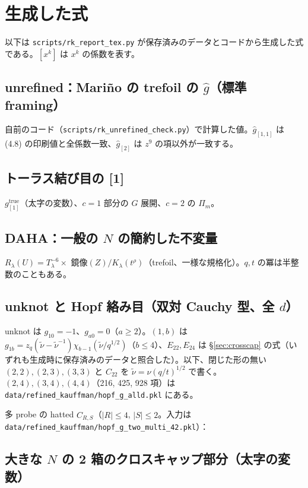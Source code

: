 \documentclass[a4paper,10pt]{ltjsarticle}
\newcommand{\tnu}{\tilde\nu}
\begin{document}
\appendix
\section{生成した式}\label{app:gen}
以下は \texttt{scripts/rk\_report\_tex.py} が保存済みのデータとコードから生成した式である。$[x^k]$ は $x^k$ の係数を表す。

\subsection{unrefined：Mariño の trefoil の $\hat g$（標準 framing）}\label{app:unref}
自前のコード（\texttt{scripts/rk\_unrefined\_check.py}）で計算した値。$\hat g_{[1,1]}$ は (4.8) の印刷値と全係数一致、$\hat g_{[2]}$ は $z^9$ の項以外が一致する。


\subsection{トーラス結び目の [1]}\label{app:torus}
$g^{\mathrm{true}}_{[1]}$（太字の変数）、$c = 1$ 部分の $G$ 展開、$c = 2$ の $\Pi_m$。


\subsection{DAHA：一般の $N$ の簡約した不変量}\label{app:daha}
$R_\lambda(U) = T_\lambda^{-6} \times$ 鏡像$(Z)/K_\lambda(t^\rho)$（trefoil、一様な規格化）。$q, t$ の冪は半整数のこともある。


\subsection{unknot と Hopf 絡み目（双対 Cauchy 型、全 $d$）}\label{app:hopf}
unknot は $g_{10} = -1$、$g_{a0} = 0$（$a \ge 2$）。$(1, b)$ は $g_{1b} = z_q(\tnu - \tnu^{-1})\chi_{b-1}(\tnu/q^{1/2})$（$b \le 4$）、$E_{22}, E_{24}$ は §\ref{sec:crosscap} の式（いずれも生成時に保存済みのデータと照合した）。以下、閉じた形の無い $(2,2), (2,3), (3,3)$ と $C_{22}$ を $\tnu = \nu (q/t)^{1/2}$ で書く。$(2,4), (3,4), (4,4)$（216, 425, 928 項）は \texttt{data/refined\_kauffman/hopf\_g\_alld.pkl} にある。


多 probe の hatted $\hat C_{R,S}$（$|R| \le 4$, $|S| \le 2$。入力は \texttt{data/refined\_kauffman/hopf\_g\_two\_multi\_42.pkl}）：


\subsection{大きな $N$ の 2 箱のクロスキャップ部分（太字の変数）}\label{app:largeN}

\end{document}
